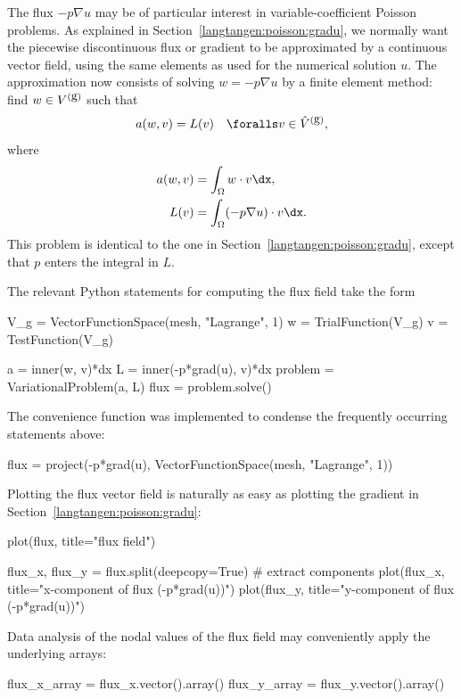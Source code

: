 The flux $-p\nabla u$ may be of particular interest in
variable-coefficient Poisson problems. As explained in
Section~\ref{langtangen:poisson:gradu}, we normally want the piecewise
discontinuous flux or gradient to be approximated by a continuous
vector field, using the same elements as used for the numerical
solution $u$. The approximation now consists of solving $w = -p\nabla
u$ by a finite element method: find $w\in V^{(\mbox{g})}$ such that
\begin{equation}
a(w, v) = L(v)\quad\foralls v\in \Vghat,
\end{equation}
where
\begin{align}
a(w, v) &= \int_\Omega w\cdot v\dx,
\\
L(v) &= \int_\Omega (-p \nabla u)\cdot v\dx.
\end{align}
This problem is identical to the one in Section~\ref{langtangen:poisson:gradu},
except that $p$ enters the integral in $L$.

The relevant Python statements for computing the flux field take the form
\begin{python}
V_g = VectorFunctionSpace(mesh, "Lagrange", 1)
w = TrialFunction(V_g)
v = TestFunction(V_g)

a = inner(w, v)*dx
L = inner(-p*grad(u), v)*dx
problem = VariationalProblem(a, L)
flux = problem.solve()
\end{python}
The convenience function  was implemented
to condense the frequently
occurring statements above:
\begin{python}
flux = project(-p*grad(u),
               VectorFunctionSpace(mesh, "Lagrange", 1))
\end{python}

Plotting the flux vector field is naturally as easy as plotting
the gradient in Section~\ref{langtangen:poisson:gradu}:
\begin{python}
plot(flux, title="flux field")

flux_x, flux_y = flux.split(deepcopy=True)  # extract components
plot(flux_x, title="x-component of flux (-p*grad(u))")
plot(flux_y, title="y-component of flux (-p*grad(u))")
\end{python}

Data analysis of the nodal values of the flux field may conveniently
apply the underlying  arrays:
\begin{python}
flux_x_array = flux_x.vector().array()
flux_y_array = flux_y.vector().array()
\end{python}

